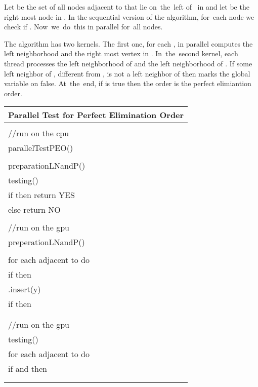 \documentclass[a4paper, 11pt]{article}
\begin{document}
Let  be the set of all nodes adjacent to  that lie on~the~left of~
in  and let  be the right most node in . In the sequential version of the 
algorithm, for~each node  we check if . Now~we~do~this 
in parallel for~all nodes. 

The algorithm has two kernels. The first one, for each , in parallel computes the left 
neighborhood  and the right most vertex in . In~the~second kernel, each thread 
 processes the left neighborhood of  and the left neighborhood of . If some 
left neighbor of , different from , is not a left neighbor of  then  
marks the global variable  on false. At~the~end, if  is true then the order 
is the perfect elimiantion order.\\

\begin{tabular}{l}
\hline
Parallel Test for Perfect Elimination Order\\
\hline
\\
//run on the cpu\\
parallelTestPEO()\\
\hspace{0.5cm}  \\
\hspace{0.5cm}  preparationLNandP()\\
\hspace{0.5cm}  testing()\\
\hspace{0.5cm}  if  then return YES\\
\hspace{0.5cm}  else return NO\\
\\
//run on the gpu\\
preperationLNandP()\\
\hspace{0.5cm}  \\
\hspace{0.5cm}  for each  adjacent to  do\\
\hspace{1cm}        if  then\\
\hspace{1.5cm}          .insert(y)\\
\hspace{1.5cm}          if  then\\
\hspace{2cm}                \\
\\
//run on the gpu\\
testing()\\
\hspace{0.5cm}  for each  adjacent to  do\\
\hspace{1cm}        if  and  then\\
\hspace{1.5cm}          \\
\\

\hline

\end{tabular}\\
\end{document}

